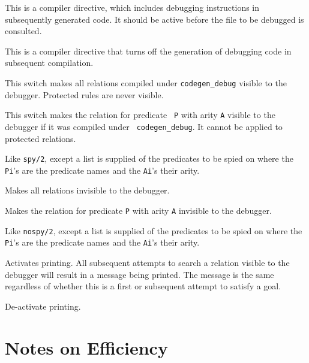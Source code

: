 \begin{description}

This is a compiler directive, which includes debugging instructions in
subsequently generated code.
It should be active before the file to be debugged is consulted.

This is a compiler directive that turns off the generation of debugging code in
subsequent compilation.

This switch makes all relations compiled under {\tt codegen\_debug}
visible to the debugger. Protected rules are never visible.

This switch makes the relation for predicate {\tt
P} with arity {\tt A} visible to the debugger if it was compiled under {\tt
codegen\_debug}. It cannot be applied to
protected relations.

\chgbarbegin
{}
Like {\tt spy/2}, except a list is supplied of the predicates to
be spied on where the {\tt Pi}'s are the predicate names 
and the {\tt Ai}'s their arity.
\chgbarend

Makes all relations invisible to the debugger.

Makes the relation for predicate {\tt P} with arity {\tt A} 
invisible to the debugger.

\chgbarbegin
{}
Like {\tt nospy/2}, except a list is supplied of the predicates to
be spied on where the {\tt Pi}'s are the predicate names and 
the {\tt Ai}'s their arity.
\chgbarend

Activates printing. All subsequent attempts to search a relation visible
to the debugger will result in a message being printed. The message is the
same regardless of whether this is a first or subsequent attempt 
to satisfy a goal.

De-activate printing.

\end{description}

\section{Notes on Efficiency}

